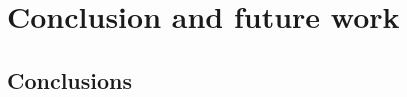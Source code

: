 \cleardoublepage
\chapter{Conclusion and future work}
\label{ch:conclusion}
\label{ch:chapter5}

\section{Conclusions}